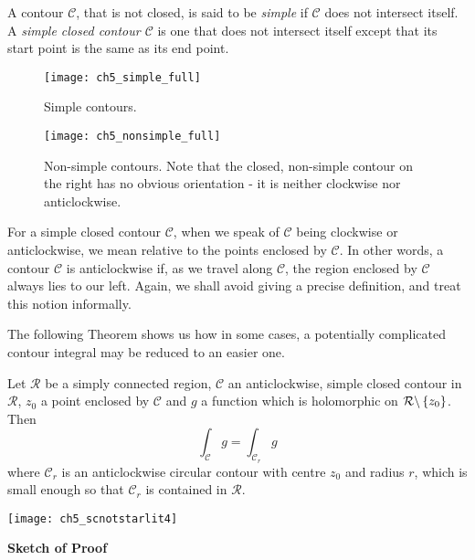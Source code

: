 \begin{definition}
A contour $\mathcal{C}$, that is not closed, is said to be \emph{simple} if $\mathcal{C}$ does not intersect itself.  A \emph{simple closed contour $\mathcal{C}$} is one that does not intersect itself except that its start point is the same as its end point.
\end{definition}

\begin{figure}[H]
\centering
\texttt{[image: ch5\_simple\_full]}
\caption{Simple contours.}
\end{figure}
\begin{figure}[H]
\centering
\texttt{[image: ch5\_nonsimple\_full]}
\caption{Non-simple contours.  Note that the closed, non-simple contour on the right has no obvious orientation - it is neither clockwise nor anticlockwise.}
\end{figure}


For a simple closed contour $\mathcal{C}$, when we speak of $\mathcal{C}$ being clockwise or anticlockwise, we mean relative to the points enclosed by $\mathcal{C}$.  In other words, a contour $\mathcal{C}$ is anticlockwise if, as we travel along $\mathcal{C}$, the region enclosed by $\mathcal{C}$ always lies to our left.  Again, we shall avoid giving a precise definition, and treat this notion informally.





The following Theorem shows us how in some cases, a potentially complicated contour integral may be reduced to an easier one.
\begin{theorem}
\label{t:sc}
Let $\mathcal{R}$ be a simply connected region, $\mathcal{C}$ an anticlockwise, simple closed contour in $\mathcal{R}$, $z_0$ a point enclosed by $\mathcal{C}$ and $g$ a function which is holomorphic on $\mathcal{R} \backslash \left\{z_0\right\}$.  Then
\[
\int_{\mathcal{C}} g = \int_{\mathcal{C}_r} g
\]
where $\mathcal{C}_r$ is an anticlockwise circular contour with centre $z_0$ and radius $r$, which is small enough so that $\mathcal{C}_r$ is contained in $\mathcal{R}$.
\end{theorem}
\begin{center}
\texttt{[image: ch5\_scnotstarlit4]}
\end{center}
{\bf Sketch of Proof}

